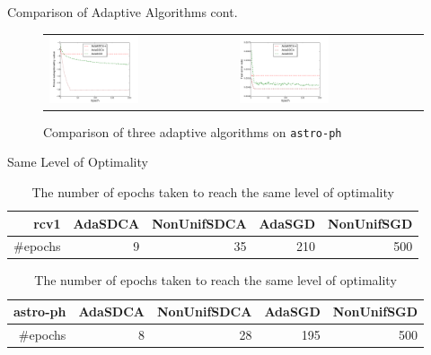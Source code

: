 \begin{frame}{Comparison of Adaptive Algorithms cont.}
\begin{figure}[htbp]
\begin{tabular}{ll}
    \centering
        \includegraphics[width=0.5\textwidth]{images/comp_adas_obej_astro.pdf} &
        \includegraphics[width=0.5\textwidth]{images/comp_adas_terror_astro.pdf}
        \end{tabular}
    \caption{Comparison of three adaptive algorithms on \texttt{astro-ph}} 
    \label{fig:ada_all2}
\end{figure}
\end{frame}

\begin{frame}{Same Level of Optimality}
\begin{table}[htbp]
    \centering
    \caption{The number of epochs taken to reach the same level of optimality}
    \label{table:timetable}
    \begin{tabular}{|r|r|r|r|r|}
        \hline 
        rcv1 & AdaSDCA & NonUnifSDCA & AdaSGD & NonUnifSGD \\
        \hline
        \#epochs & 9 & 35 & 210 & 500 \\         
        \hline
    \end{tabular}
    \begin{tabular}{|r|r|r|r|r|}
        \hline 
        astro-ph & AdaSDCA & NonUnifSDCA & AdaSGD & NonUnifSGD \\
        \hline
        \#epochs & 8 & 28 & 195 & 500 \\         
        \hline
    \end{tabular}    
\end{table}
\end{frame}

